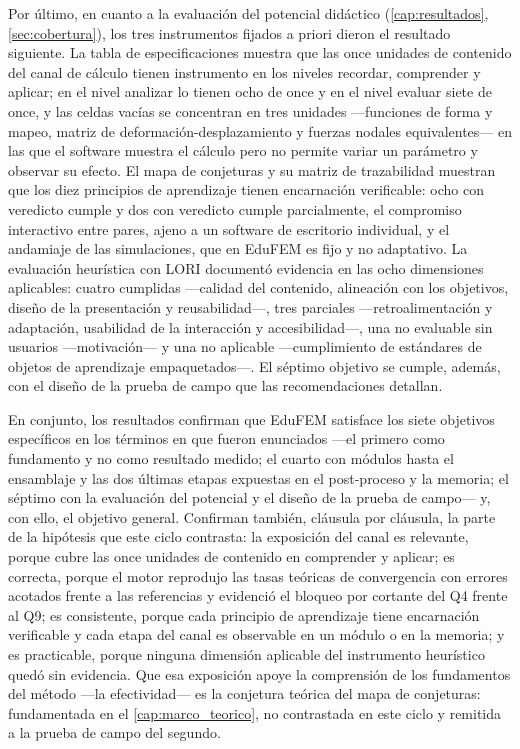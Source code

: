 Por último, en cuanto a la evaluación del potencial didáctico (\autoref{cap:resultados}, \autoref{sec:cobertura}), los tres instrumentos fijados a priori dieron el resultado siguiente. La tabla de especificaciones muestra que las once unidades de contenido del canal de cálculo tienen instrumento en los niveles recordar, comprender y aplicar; en el nivel analizar lo tienen ocho de once y en el nivel evaluar siete de once, y las celdas vacías se concentran en tres unidades —funciones de forma y mapeo, matriz de deformación-desplazamiento y fuerzas nodales equivalentes— en las que el software muestra el cálculo pero no permite variar un parámetro y observar su efecto. El mapa de conjeturas y su matriz de trazabilidad muestran que los diez principios de aprendizaje tienen encarnación verificable: ocho con veredicto cumple y dos con veredicto cumple parcialmente, el compromiso interactivo entre pares, ajeno a un software de escritorio individual, y el andamiaje de las simulaciones, que en EduFEM es fijo y no adaptativo. La evaluación heurística con LORI documentó evidencia en las ocho dimensiones aplicables: cuatro cumplidas —calidad del contenido, alineación con los objetivos, diseño de la presentación y reusabilidad—, tres parciales —retroalimentación y adaptación, usabilidad de la interacción y accesibilidad—, una no evaluable sin usuarios —motivación— y una no aplicable —cumplimiento de estándares de objetos de aprendizaje empaquetados—. El séptimo objetivo se cumple, además, con el diseño de la prueba de campo que las recomendaciones detallan.

En conjunto, los resultados confirman que EduFEM satisface los siete objetivos específicos en los términos en que fueron enunciados —el primero como fundamento y no como resultado medido; el cuarto con módulos hasta el ensamblaje y las dos últimas etapas expuestas en el post-proceso y la memoria; el séptimo con la evaluación del potencial y el diseño de la prueba de campo— y, con ello, el objetivo general. Confirman también, cláusula por cláusula, la parte de la hipótesis que este ciclo contrasta: la exposición del canal es relevante, porque cubre las once unidades de contenido en comprender y aplicar; es correcta, porque el motor reprodujo las tasas teóricas de convergencia con errores acotados frente a las referencias y evidenció el bloqueo por cortante del Q4 frente al Q9; es consistente, porque cada principio de aprendizaje tiene encarnación verificable y cada etapa del canal es observable en un módulo o en la memoria; y es practicable, porque ninguna dimensión aplicable del instrumento heurístico quedó sin evidencia. Que esa exposición apoye la comprensión de los fundamentos del método —la efectividad— es la conjetura teórica del mapa de conjeturas: fundamentada en el \autoref{cap:marco_teorico}, no contrastada en este ciclo y remitida a la prueba de campo del segundo.

